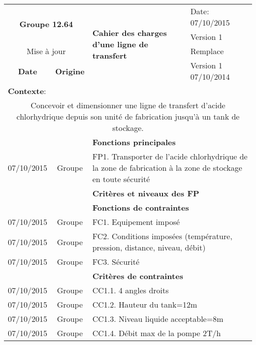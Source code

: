 \documentclass[a4paper]{report}
\begin{document}
\begin{center}
\begin{footnotesize}
\begin{tabular}{|c|c|l|l|}
    \hline
    \multicolumn{2}{|c|}{\multirow{2}{*}{\normalsize \textbf{Groupe 12.64}}} & \multirow{4}{8cm}{\centering\large \textbf{Cahier des charges d'une ligne de transfert}} & Date: 07/10/2015 \\ \cline{4-4} 
    \multicolumn{2}{|l|}{} & & Version 1 \\ \cline{1-2} \cline{4-4} 
    \multicolumn{2}{|c|}{Mise à jour} & & Remplace \\ \cline{1-2} \cline{4-4} 
    \textbf{Date} & \textbf{Origine} & & Version 1 07/10/2014 \\ \hline
    \multicolumn{4}{|l|}{\textbf{Contexte}:} \\ 
    \multicolumn{4}{|p{15cm}|}{Concevoir et dimensionner une ligne de transfert d'acide chlorhydrique depuis son unité de fabrication jusqu'à un tank de stockage.} \\ \hline
     & & \multicolumn{2}{l|}{\textbf{Fonctions principales}} \\
    07/10/2015 & Groupe & \multicolumn{2}{p{11cm}|}{FP1. Transporter de l'acide chlorhydrique de la zone de fabrication à la zone de stockage en toute sécurité} \\
    \hline
     & & \multicolumn{2}{p{11cm}|}{\textbf{Critères et niveaux des FP}} \\ \hline
     & & \multicolumn{2}{p{11cm}|}{\textbf{Fonctions de contraintes}} \\
    07/10/2015 & Groupe & \multicolumn{2}{p{11cm}|}{FC1. Equipement imposé} \\
    07/10/2015 & Groupe & \multicolumn{2}{p{11cm}|}{FC2. Conditions imposées (température, pression, distance, niveau, débit)} \\
    07/10/2015 & Groupe & \multicolumn{2}{p{11cm}|}{FC3. Sécurité}\\ \hline
     & & \multicolumn{2}{p{11cm}|}{\textbf{Critères de contraintes}} \\
    07/10/2015 & Groupe & \multicolumn{2}{p{11cm}|}{CC1.1. 4 angles droits} \\
    07/10/2015 & Groupe & \multicolumn{2}{p{11cm}|}{CC1.2. Hauteur du tank=12m} \\
    07/10/2015 & Groupe & \multicolumn{2}{p{11cm}|}{CC1.3. Niveau liquide acceptable=8m} \\
  07/10/2015 & Groupe & \multicolumn{2}{p{11cm}|}{CC1.4. Débit max de la pompe 2T/h} \\

\end{tabular}
\end{footnotesize}
\end{center}
\end{document}
